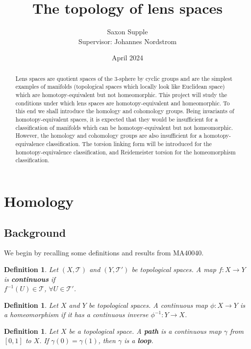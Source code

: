 \documentclass{article}
\title{The topology of lens spaces}
\author{Saxon Supple\\Supervisor: Johannes Nordstrom}
\date{April 2024}
\newtheorem{definition}[theorem]{Definition}
\begin{document}
\maketitle
\begin{abstract}
\noindent Lens spaces are quotient spaces of the $3$-sphere by cyclic groups and are the simplest examples of manifolds (topological spaces which locally look like Euclidean space) which are homotopy-equivalent but not homeomorphic. This project will study the conditions under which lens spaces are homotopy-equivalent and homeomorphic. To this end we shall introduce the homology and cohomology groups. Being invariants of homotopy-equivalent spaces, it is expected that they would be insufficient for a classification of manifolds which can be homotopy-equivalent but not homeomorphic. However, the homology and cohomology groups are also insufficient for a homotopy-equivalence classification. The torsion linking form will be introduced for the homotopy-equivalence classification, and Reidemeister torsion for the homeomorphism classification.
\end{abstract}
\tableofcontents

\section{Homology}
\subsection{Background}
We begin by recalling some definitions and results from MA40040.
\begin{definition}
Let $(X,\mathcal{T})$ and $(Y,\mathcal{T}')$ be topological spaces. A map $f\colon X\to Y$ is \textbf{continuous} if\\
$f^{-1}(U)\in\mathcal{T}$, $\forall U\in\mathcal{T}'$.
\end{definition}

\begin{definition}
Let $X$ and $Y$ be topological spaces. A continuous map $\phi\colon X\to Y$ is a homeomorphism if it has a continuous inverse $\phi^{-1}\colon Y\to X$.
\end{definition}

\begin{definition}
Let $X$ be a topological space. A \textbf{path} is a continuous map $\gamma$ from $[0,1]$ to $X$. If $\gamma(0)=\gamma(1)$, then $\gamma$ is a \textbf{loop}.
\end{definition}
\end{document}
